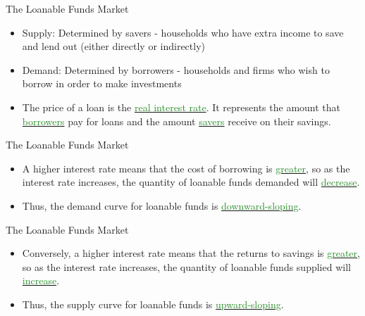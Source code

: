 \documentclass[xcolor={dvipsnames},pdf, hyperref={colorlinks=true, citecolor=ForestGreen, linkcolor=BlueViolet, urlcolor=Magenta}]{beamer}
\theoremstyle{definition}
\newcommand{\dd}[1]{{\underline{\textcolor{ForestGreen}{#1}}}}
\begin{document}
\begin{frame}{The Loanable Funds Market}
\begin{itemize}

		\item Supply: Determined by savers - households who have extra income to save and lend out (either directly or indirectly)
		\item Demand: Determined by borrowers - households and firms who wish to borrow in order to make investments
	
\item The price of a loan is the \dd{real interest rate}. It represents the amount that \dd{borrowers} pay for loans and the amount \dd{savers} receive on their savings.
	
\end{itemize}
\end{frame}

\begin{frame}{The Loanable Funds Market}
\begin{itemize}
	\item A higher interest rate means that the cost of borrowing is \dd{greater}, so as the interest rate increases, the quantity of loanable funds demanded will \dd{decrease}. 
	\item Thus, the demand curve for loanable funds is \dd{downward-sloping}. 
\end{itemize}
\end{frame}

\begin{frame}{The Loanable Funds Market}
\begin{itemize}
	\item Conversely, a higher interest rate means that the returns to savings is \dd{greater}, so as the interest rate increases, the quantity of loanable funds supplied will \dd{increase}. 
	\item Thus, the supply curve for loanable funds is \dd{upward-sloping}.
\end{itemize}
\end{frame}
\end{document}
